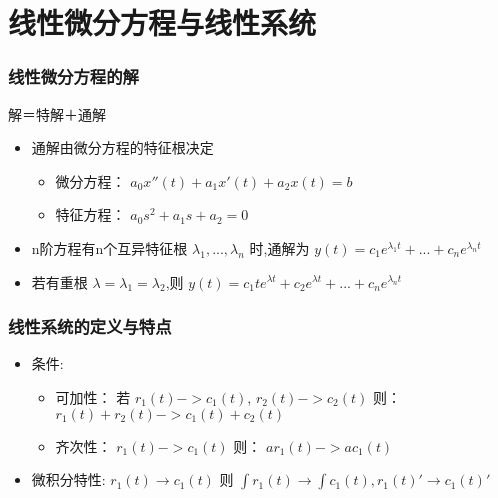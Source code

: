 \documentclass{beamer}
\begin{document}
\section{线性微分方程与线性系统}
\label{sec-2}
\begin{frame}
\frametitle{线性微分方程的解}
\label{sec-2-1}

  解＝特解＋通解

\begin{itemize}
\item <2->通解由微分方程的特征根决定
\begin{itemize}
\item <3->微分方程： $a_0 x''(t)+a_1 x'(t)+a_2 x(t) =b$
\item <4->特征方程：  $a_0s^2+a_1 s + a_2=0$
\end{itemize}
\item <5-> n阶方程有n个互异特征根 $\lambda_1,...,\lambda_n$ 时,通解为
     $y(t)=c_1e^{\lambda_1 t}+...+c_ne^{\lambda_n t}$
\item <6-> 若有重根  $\lambda=\lambda_1=\lambda_2$,则
     $y(t)=c_1 t e^{\lambda t}+c_2e^{\lambda t}+...+c_ne^{\lambda_n t}$
\end{itemize}
\end{frame}
\begin{frame}
\frametitle{线性系统的定义与特点}
\label{sec-2-2}

\begin{itemize}
\item <2->条件:
\begin{itemize}
\item 可加性： 若 $r_1(t)->c_1(t)$, $r_2(t)->c_2(t)$ 则： $r_1(t)+r_2(t)->c_1(t)+c_2(t)$
\item 齐次性： $r_1(t)->c_1(t)$ 则： $a r_1(t) -> a c_1(t)$
\end{itemize}
\item <3-> 微积分特性: $r_1(t)\rightarrow c_1(t)$  则  $\int r_1(t) \rightarrow \int c_1(t), r_1(t)'\rightarrow c_1(t)'$
\end{itemize}
\end{frame}
\end{document}
